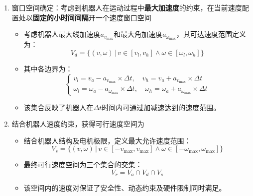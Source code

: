 \documentclass[../main.tex]{subfiles}
\begin{document}
\begin{enumerate}
\begin{itemize}
\begin{enumerate}
                    \item 窗口空间确定：考虑到机器人在运动过程中\textbf{最大加速度}的约束，在当前速度配置处以\textbf{固定的小时间间隔}开一个速度窗口空间
                        \begin{itemize}
                            \item {\small\kaishu 考虑机器人最大线加速度$a_{v_{\max}}$和最大角加速度$a_{\omega_{\max}}$，其可达速度范围定义为：}
                            \[
                            V_d = \{(v,\omega)\,|\,v \in [v_l,v_h] \wedge \omega \in [\omega_l,\omega_h]\}
                            \]
                            \item {\small\kaishu 其中各边界为：}
                            \[
                            \begin{cases}
                            v_l = v_a - a_{v_{\max}} \times \Delta t, \quad v_h = v_a + a_{v_{\max}} \times \Delta t \\
                            \omega_l = \omega_a - a_{\omega_{\max}} \times \Delta t, \quad \omega_h = \omega_a + a_{\omega_{\max}} \times \Delta t
                            \end{cases}
                            \]
                            \item {\small\kaishu 该集合反映了机器人在$\Delta t$时间内可通过加减速达到的速度范围。}
                        \end{itemize}
                
                    \item 结合机器人速度约束，获得可行速度空间为
                        \begin{itemize}
                            \item {\small\kaishu 结合机器人结构及电机极限，定义最大允许速度范围：}
                            \[
                            V_s = \{(v,\omega)\,|\,v \in [-v_{\max},v_{\max}] \wedge \omega \in [-\omega_{\max},\omega_{\max}]\}
                            \]
                            \item {\small\kaishu 最终可行速度空间为三个集合的交集：}
                            \[
                            V_r = V_a \cap V_d \cap V_s
                            \]
                            \item {\small\kaishu 该空间内的速度对保证了安全性、动态约束及硬件限制同时满足。}
                        \end{itemize}
                

\end{enumerate}
\end{itemize}
\end{enumerate}
\end{document}
